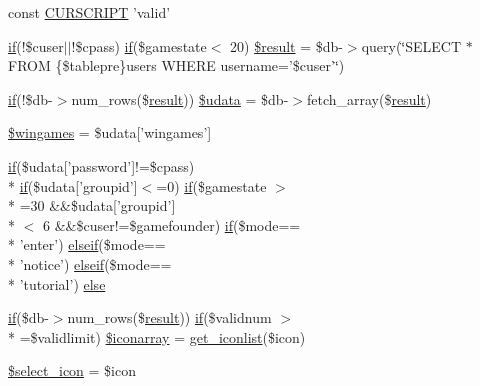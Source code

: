 \begin{DoxyCompactItemize}
\item 
const \hyperlink{valid_8php_a39c39f525eceb86cabc338804f230e80}{C\+U\+R\+S\+C\+R\+I\+P\+T} 'valid'
\item 
\hyperlink{login__old_8php_a4ac1118c2e44c513a674bc1793ba6c90}{if}(!\$cuser$\vert$$\vert$!\$cpass) \hyperlink{login__old_8php_a4ac1118c2e44c513a674bc1793ba6c90}{if}(\$gamestate$<$ 20) \hyperlink{valid_8php_a112ef069ddc0454086e3d1e6d8d55d07}{\$result} = \$db-\/$>$query(\char`\"{}S\+E\+L\+E\+C\+T $\ast$ F\+R\+O\+M \{\$tablepre\}users W\+H\+E\+R\+E username='\$cuser'\char`\"{})
\item 
\hyperlink{login__old_8php_a4ac1118c2e44c513a674bc1793ba6c90}{if}(!\$db-\/$>$num\+\_\+rows(\$\hyperlink{templates_2install_8php_abdecde238169a1e34f68354fc9968af0}{result})) \hyperlink{valid_8php_aa64a6e7c321a5fc5c5089fc201f285cb}{\$udata} = \$db-\/$>$fetch\+\_\+array(\$\hyperlink{templates_2install_8php_abdecde238169a1e34f68354fc9968af0}{result})
\item 
\hyperlink{valid_8php_aacaeb07af0678af177be3eebd652f775}{\$wingames} = \$udata\mbox{[}'wingames'\mbox{]}
\item 
\hyperlink{login__old_8php_a4ac1118c2e44c513a674bc1793ba6c90}{if}(\$udata\mbox{[}'password'\mbox{]}!=\$cpass) \\*
\hyperlink{login__old_8php_a4ac1118c2e44c513a674bc1793ba6c90}{if}(\$udata\mbox{[}'groupid'\mbox{]}$<$=0) \hyperlink{login__old_8php_a4ac1118c2e44c513a674bc1793ba6c90}{if}(\$gamestate $>$\\*
=30 \&\&\$udata\mbox{[}'groupid'\mbox{]}\\*
$<$ 6 \&\&\$cuser!=\$gamefounder) \hyperlink{login__old_8php_a4ac1118c2e44c513a674bc1793ba6c90}{if}(\$mode== \\*
'enter') \hyperlink{urlist_8php_a77f52b43f81ed05a41b68c2161789055}{elseif}(\$mode== \\*
'notice') \hyperlink{urlist_8php_a77f52b43f81ed05a41b68c2161789055}{elseif}(\$mode== \\*
'tutorial') \hyperlink{valid_8php_a227e6cec8cb6be0e42771a246a107c95}{else}
\item 
\hyperlink{login__old_8php_a4ac1118c2e44c513a674bc1793ba6c90}{if}(\$db-\/$>$num\+\_\+rows(\$\hyperlink{templates_2install_8php_abdecde238169a1e34f68354fc9968af0}{result})) \hyperlink{login__old_8php_a4ac1118c2e44c513a674bc1793ba6c90}{if}(\$validnum $>$\\*
=\$validlimit) \hyperlink{valid_8php_a163e9078b577209cad21d879a7a885b5}{\$iconarray} = \hyperlink{user_8func_8php_a7a9045f8927edbb8c9fd22b5f9effd7c}{get\+\_\+iconlist}(\$icon)
\item 
\hyperlink{valid_8php_a18d851a26297fb49eda4d94e0605ba05}{\$select\+\_\+icon} = \$icon
\end{DoxyCompactItemize}



